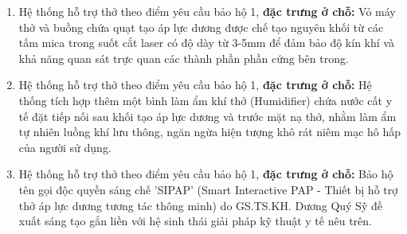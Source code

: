 \documentclass[12pt,a4paper]{article}
\begin{document}
\begin{enumerate}
    \item Hệ thống hỗ trợ thở theo điểm yêu cầu bảo hộ 1, \textbf{đặc trưng ở chỗ:} Vỏ máy thở và buồng chứa quạt tạo áp lực dương được chế tạo nguyên khối từ các tấm mica trong suốt cắt laser có độ dày từ 3-5mm để đảm bảo độ kín khí và khả năng quan sát trực quan các thành phần phần cứng bên trong.
    
    \item Hệ thống hỗ trợ thở theo điểm yêu cầu bảo hộ 1, \textbf{đặc trưng ở chỗ:} Hệ thống tích hợp thêm một bình làm ẩm khí thở (Humidifier) chứa nước cất y tế đặt tiếp nối sau khối tạo áp lực dương và trước mặt nạ thở, nhằm làm ẩm tự nhiên luồng khí lưu thông, ngăn ngừa hiện tượng khô rát niêm mạc hô hấp của người sử dụng.
    
    \item Hệ thống hỗ trợ thở theo điểm yêu cầu bảo hộ 1, \textbf{đặc trưng ở chỗ:} Bảo hộ tên gọi độc quyền sáng chế 'SIPAP' (Smart Interactive PAP - Thiết bị hỗ trợ thở áp lực dương tương tác thông minh) do GS.TS.KH. Dương Quý Sỹ đề xuất sáng tạo gắn liền với hệ sinh thái giải pháp kỹ thuật y tế nêu trên.
\end{enumerate}
\end{document}
